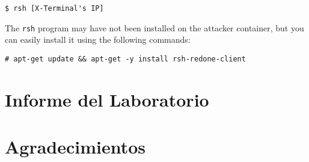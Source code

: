 \begin{lstlisting}
$ rsh [X-Terminal's IP]
\end{lstlisting}

The \texttt{rsh} program may have not been installed on the attacker container, 
but you can easily install it using the following commands:

\begin{lstlisting}
# apt-get update && apt-get -y install rsh-redone-client 
\end{lstlisting}


\section{Informe del Laboratorio}




\section*{Agradecimientos}










